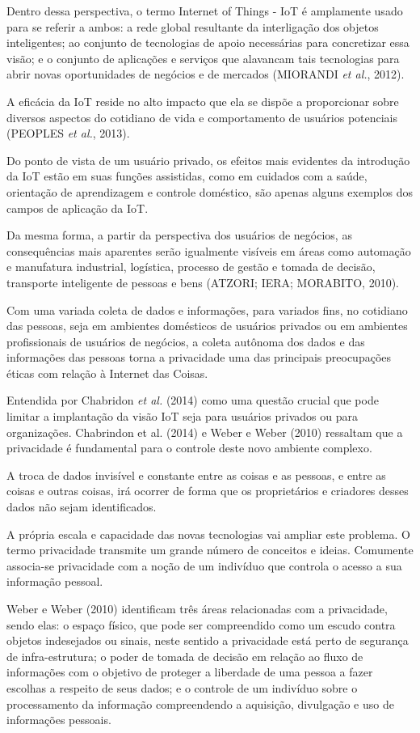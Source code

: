 Dentro dessa perspectiva, o termo Internet of Things - IoT é amplamente usado para se referir a ambos: a rede global resultante da interligação dos objetos inteligentes; ao conjunto de tecnologias de apoio necessárias para concretizar essa visão; e o conjunto de aplicações e serviços que alavancam tais tecnologias para abrir novas oportunidades de negócios e de mercados (MIORANDI \textit{et al.}, 2012).

A eficácia da IoT reside no alto impacto que ela se dispõe a proporcionar sobre diversos aspectos do cotidiano de vida e comportamento de usuários potenciais (PEOPLES \textit{et al.}, 2013).

Do ponto de vista de um usuário privado, os efeitos mais evidentes da introdução da IoT estão em suas funções assistidas, como em cuidados com a saúde, orientação de aprendizagem e controle doméstico, são apenas alguns exemplos dos campos de aplicação da IoT.

Da mesma forma, a partir da perspectiva dos usuários de negócios, as consequências mais aparentes serão igualmente visíveis em áreas como automação e manufatura industrial, logística, processo de gestão e tomada de decisão, transporte inteligente de pessoas e bens (ATZORI; IERA; MORABITO, 2010).

Com uma variada coleta de dados e informações, para variados fins, no cotidiano das pessoas, seja em ambientes domésticos de usuários privados ou em ambientes profissionais de usuários de negócios, a coleta autônoma dos dados e das informações das pessoas torna a privacidade uma das principais preocupações éticas com relação à Internet das Coisas.

Entendida por Chabridon \textit{et al.} (2014) como uma questão crucial que pode limitar a implantação da visão IoT seja para usuários privados ou para organizações. Chabrindon et al. (2014) e Weber e Weber (2010) ressaltam que a privacidade é fundamental para o controle deste novo ambiente complexo.

A troca de dados invisível e constante entre as coisas e as pessoas, e entre as coisas e outras coisas, irá ocorrer de forma que os proprietários e criadores desses dados não sejam identificados.

A própria escala e capacidade das novas tecnologias vai ampliar este problema. O termo privacidade transmite um grande número de conceitos e ideias. Comumente associa-se privacidade com a noção de um indivíduo que controla o acesso a sua informação pessoal.

Weber e Weber (2010) identificam três áreas relacionadas com a privacidade, sendo elas: o espaço físico, que pode ser compreendido como um escudo contra objetos indesejados ou sinais, neste sentido a privacidade está perto de segurança de infra-estrutura; o poder de tomada de decisão em relação ao fluxo de informações com o objetivo de proteger a liberdade de uma pessoa a fazer escolhas a respeito de seus dados; e o controle de um indivíduo sobre o processamento da informação compreendendo a aquisição, divulgação e uso de informações pessoais.

